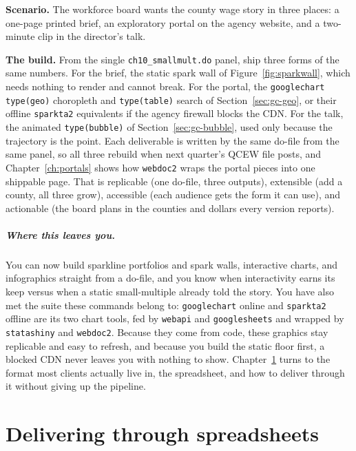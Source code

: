 \documentclass[
    a4paper,
    fontsize=10pt,
    twoside=true,
    numbers=noenddot,
]{kaobook}
\newcounter{appliedexample}
\newenvironment{appliedexample}[1][]{%
    \refstepcounter{appliedexample}%
    \begin{appliedexamplebox}[frametitle={Applied Example~\theappliedexample.~~#1}]%
}{%
    \end{appliedexamplebox}%
}
\begin{document}
\begin{appliedexample}[One dataset, three deliverables]
\textbf{Scenario.} The workforce board wants the county wage story in three places: a one-page printed brief, an exploratory portal on the agency website, and a two-minute clip in the director's talk.

\medskip
\textbf{The build.} From the single \texttt{ch10\_smallmult.do} panel, ship three forms of the same numbers. For the brief, the static spark wall of Figure~\ref{fig:sparkwall}, which needs nothing to render and cannot break. For the portal, the \texttt{googlechart type(geo)} choropleth and \texttt{type(table)} search of Section~\ref{sec:gc-geo}, or their offline \texttt{sparkta2} equivalents if the agency firewall blocks the CDN. For the talk, the animated \texttt{type(bubble)} of Section~\ref{sec:gc-bubble}, used only because the trajectory is the point. Each deliverable is written by the same do-file from the same panel, so all three rebuild when next quarter's QCEW file posts, and Chapter~\ref{ch:portals} shows how \texttt{webdoc2} wraps the portal pieces into one shippable page. That is replicable (one do-file, three outputs), extensible (add a county, all three grow), accessible (each audience gets the form it can use), and actionable (the board plans in the counties and dollars every version reports).
\end{appliedexample}

\paragraph{Where this leaves you.} You can now build sparkline portfolios and spark walls, interactive charts, and infographics straight from a do-file, and you know when interactivity earns its keep versus when a static small-multiple already told the story. You have also met the suite these commands belong to: \texttt{googlechart} online and \texttt{sparkta2} offline are its two chart tools, fed by \texttt{webapi} and \texttt{googlesheets} and wrapped by \texttt{statashiny} and \texttt{webdoc2}. Because they come from code, these graphics stay replicable and easy to refresh, and because you build the static floor first, a blocked CDN never leaves you with nothing to show. Chapter~\ref{ch:sheets} turns to the format most clients actually live in, the spreadsheet, and how to deliver through it without giving up the pipeline.
\chapter{Delivering through spreadsheets}\label{ch:sheets}
\end{document}
